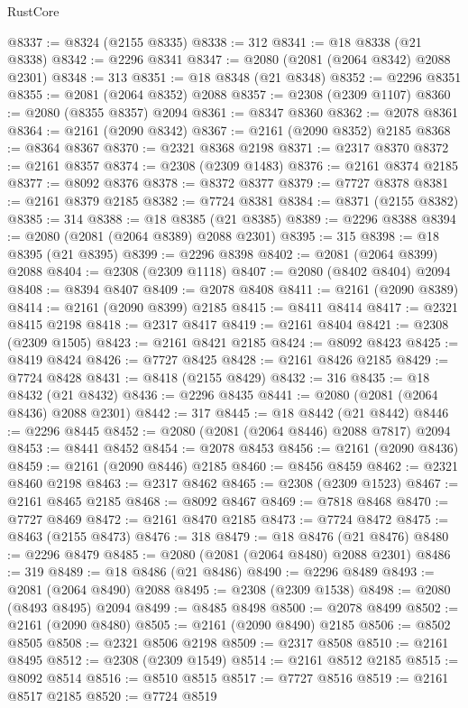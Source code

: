 \begin{lexlean}{RustCore}
\begin{coremodule}
@8337 := @8324 (@2155 @8335)
@8338 := 312
@8341 := @18 @8338 (@21 @8338)
@8342 := @2296 @8341
@8347 := @2080 (@2081 (@2064 @8342) @2088 @2301)
@8348 := 313
@8351 := @18 @8348 (@21 @8348)
@8352 := @2296 @8351
@8355 := @2081 (@2064 @8352) @2088
@8357 := @2308 (@2309 @1107)
@8360 := @2080 (@8355 @8357) @2094
@8361 := @8347 @8360
@8362 := @2078 @8361
@8364 := @2161 (@2090 @8342)
@8367 := @2161 (@2090 @8352) @2185
@8368 := @8364 @8367
@8370 := @2321 @8368 @2198
@8371 := @2317 @8370
@8372 := @2161 @8357
@8374 := @2308 (@2309 @1483)
@8376 := @2161 @8374 @2185
@8377 := @8092 @8376
@8378 := @8372 @8377
@8379 := @7727 @8378
@8381 := @2161 @8379 @2185
@8382 := @7724 @8381
@8384 := @8371 (@2155 @8382)
@8385 := 314
@8388 := @18 @8385 (@21 @8385)
@8389 := @2296 @8388
@8394 := @2080 (@2081 (@2064 @8389) @2088 @2301)
@8395 := 315
@8398 := @18 @8395 (@21 @8395)
@8399 := @2296 @8398
@8402 := @2081 (@2064 @8399) @2088
@8404 := @2308 (@2309 @1118)
@8407 := @2080 (@8402 @8404) @2094
@8408 := @8394 @8407
@8409 := @2078 @8408
@8411 := @2161 (@2090 @8389)
@8414 := @2161 (@2090 @8399) @2185
@8415 := @8411 @8414
@8417 := @2321 @8415 @2198
@8418 := @2317 @8417
@8419 := @2161 @8404
@8421 := @2308 (@2309 @1505)
@8423 := @2161 @8421 @2185
@8424 := @8092 @8423
@8425 := @8419 @8424
@8426 := @7727 @8425
@8428 := @2161 @8426 @2185
@8429 := @7724 @8428
@8431 := @8418 (@2155 @8429)
@8432 := 316
@8435 := @18 @8432 (@21 @8432)
@8436 := @2296 @8435
@8441 := @2080 (@2081 (@2064 @8436) @2088 @2301)
@8442 := 317
@8445 := @18 @8442 (@21 @8442)
@8446 := @2296 @8445
@8452 := @2080 (@2081 (@2064 @8446) @2088 @7817) @2094
@8453 := @8441 @8452
@8454 := @2078 @8453
@8456 := @2161 (@2090 @8436)
@8459 := @2161 (@2090 @8446) @2185
@8460 := @8456 @8459
@8462 := @2321 @8460 @2198
@8463 := @2317 @8462
@8465 := @2308 (@2309 @1523)
@8467 := @2161 @8465 @2185
@8468 := @8092 @8467
@8469 := @7818 @8468
@8470 := @7727 @8469
@8472 := @2161 @8470 @2185
@8473 := @7724 @8472
@8475 := @8463 (@2155 @8473)
@8476 := 318
@8479 := @18 @8476 (@21 @8476)
@8480 := @2296 @8479
@8485 := @2080 (@2081 (@2064 @8480) @2088 @2301)
@8486 := 319
@8489 := @18 @8486 (@21 @8486)
@8490 := @2296 @8489
@8493 := @2081 (@2064 @8490) @2088
@8495 := @2308 (@2309 @1538)
@8498 := @2080 (@8493 @8495) @2094
@8499 := @8485 @8498
@8500 := @2078 @8499
@8502 := @2161 (@2090 @8480)
@8505 := @2161 (@2090 @8490) @2185
@8506 := @8502 @8505
@8508 := @2321 @8506 @2198
@8509 := @2317 @8508
@8510 := @2161 @8495
@8512 := @2308 (@2309 @1549)
@8514 := @2161 @8512 @2185
@8515 := @8092 @8514
@8516 := @8510 @8515
@8517 := @7727 @8516
@8519 := @2161 @8517 @2185
@8520 := @7724 @8519

\end{coremodule}
\end{lexlean}
